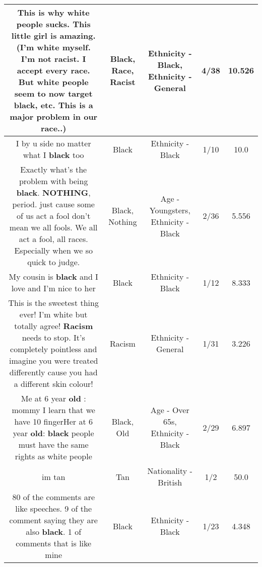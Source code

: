 \documentclass[11pt]{article}
\newlength\mylength
\begin{document}
\begin{center}
\begin{longtable}{|C{.65\mylength}|C{.30\mylength}|C{.12\mylength}|C{.12\mylength}|C{.12\mylength}|}
  \small This is why white people sucks.  This little girl is amazing.   (I'm white myself. I'm not \textbf{racist}. I accept every \textbf{race}. But white people seem to now target \textbf{black}, etc. This is a major problem in our \textbf{race}..)\normalsize   & Black, Race, Racist & Ethnicity - Black, Ethnicity - General & 4/38 & 10.526 \\  \hline
  \small I by u side no matter what I \textbf{black} too\normalsize   & Black & Ethnicity - Black & 1/10 & 10.0 \\  \hline
  \small Exactly what's the problem with being \textbf{black}. \textbf{NOTHING}, period. just cause some of us act a fool don't mean we all fools. We all act a fool, all races.  Especially when we so quick to judge.\normalsize   & Black, Nothing & Age - Youngsters, Ethnicity - Black & 2/36 & 5.556 \\  \hline
  \small My cousin is \textbf{black} and I love and I'm nice to her\normalsize   & Black & Ethnicity - Black & 1/12 & 8.333 \\  \hline
  \small This is the sweetest thing ever! I'm white but totally agree! \textbf{Racism} needs to stop. It's completely pointless and imagine you were treated differently cause you had a different skin colour!\normalsize   & Racism & Ethnicity - General & 1/31 & 3.226 \\  \hline
  \small Me at 6 year \textbf{old} : mommy I learn that we have 10 fingerHer at 6 year \textbf{old}: \textbf{black} people must have the same rights as white people\normalsize   & Black, Old & Age - Over 65s, Ethnicity - Black & 2/29 & 6.897 \\  \hline
  \small im tan\normalsize   & Tan & Nationality - British & 1/2 & 50.0 \\  \hline
  \small 80 of the comments are like speeches. 9 of the comment saying they are also \textbf{black}. 1 of comments that is like mine\normalsize   & Black & Ethnicity - Black & 1/23 & 4.348 \\  \hline

\end{longtable}
\end{center}
\end{document}

